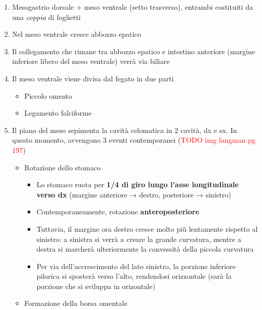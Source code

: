 \documentclass[italian,]{article}
\providecommand{\tightlist}{%
  \setlength{\itemsep}{0pt}\setlength{\parskip}{0pt}}
\newcommand{\TODO}[1]{\textcolor{red}{\textsf{\footnotesize{TODO #1}}}} %
\begin{document}
\begin{enumerate}
\def\labelenumi{\arabic{enumi}.}
\tightlist
\item
  Mesogastrio dorsale + meso ventrale (setto trasverso), entrambi
  costituiti da una \emph{coppia} di foglietti
\item
  Nel meso ventrale cresce abbozzo epatico
\item
  Il collegamento che rimane tra abbozzo epatico e intestino anteriore
  (margine inferiore libero del meso ventrale) verrà via biliare
\item
  Il meso ventrale viene divisa dal fegato in due parti

  \begin{itemize}
  \tightlist
  \item
    Piccolo omento
  \item
    Legamento falciforme
  \end{itemize}
\item
  Il piano del meso sepimenta la cavità celomatica in 2 cavità, dx e sx.
  In questo momento, avvengono 3 eventi contemporanei
  (\TODO{img langman pg 197})

  \begin{itemize}
  \tightlist
  \item
    Rotazione dello stomaco

    \begin{itemize}
    \tightlist
    \item
      Lo stomaco ruota per \textbf{1/4 di giro lungo l'asse
      longitudinale verso dx} (margine anteriore → destro, posteriore →
      sinistro)
    \item
      Contemporaneamente, rotazione \textbf{anteroposteriore}
    \item
      Tuttavia, il margine ora destro cresce molto più lentamente
      rispetto al sinistro: a sinistra si verrà a creare la grande
      curvatura, mentre a destra si marcherà ulteriormente la convessità
      della piccola curvatura
    \item
      Per via dell'accrescimento del lato sinistro, la porzione
      inferiore pilorica si sposterà verso l'alto, rendendosi
      orizzontale (sarà la porzione che si sviluppa in orizontale)
    \end{itemize}
  \item
    Formazione della borsa omentale


\end{itemize}
\end{enumerate}
\end{document}
